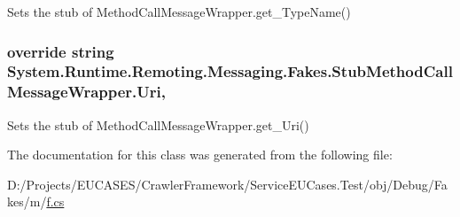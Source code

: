 Sets the stub of Method\-Call\-Message\-Wrapper.\-get\-\_\-\-Type\-Name()

\hypertarget{class_system_1_1_runtime_1_1_remoting_1_1_messaging_1_1_fakes_1_1_stub_method_call_message_wrapper_a584b77381507f76a996f6d22713fe043}{
\subsubsection[{Uri}]{\setlength{\rightskip}{0pt plus 5cm}override string System.\-Runtime.\-Remoting.\-Messaging.\-Fakes.\-Stub\-Method\-Call\-Message\-Wrapper.\-Uri\hspace{0.3cm}{\ttfamily [get]}, {\ttfamily [set]}}}\label{class_system_1_1_runtime_1_1_remoting_1_1_messaging_1_1_fakes_1_1_stub_method_call_message_wrapper_a584b77381507f76a996f6d22713fe043}


Sets the stub of Method\-Call\-Message\-Wrapper.\-get\-\_\-\-Uri()



The documentation for this class was generated from the following file\-:\begin{DoxyCompactItemize}
\item 
D\-:/\-Projects/\-E\-U\-C\-A\-S\-E\-S/\-Crawler\-Framework/\-Service\-E\-U\-Cases.\-Test/obj/\-Debug/\-Fakes/m/\hyperlink{m_2f_8cs}{f.\-cs}\end{DoxyCompactItemize}
